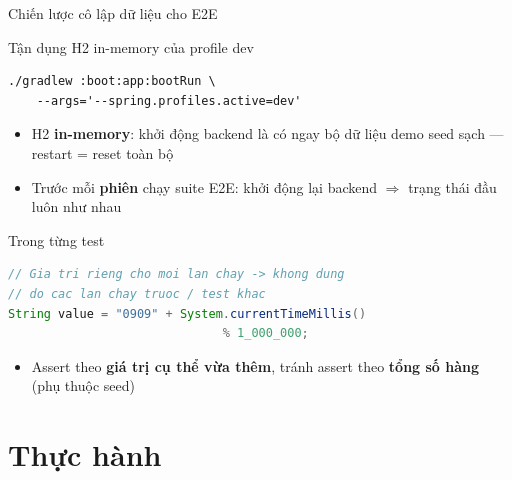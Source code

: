 \documentclass[aspectratio=169,12pt]{beamer}
\begin{document}
\begin{frame}[fragile]{Chiến lược cô lập dữ liệu cho E2E}
  \vspace*{-0.4em}
  \begin{block}{Tận dụng H2 in-memory của profile dev}
\begin{lstlisting}
./gradlew :boot:app:bootRun \
    --args='--spring.profiles.active=dev'
\end{lstlisting}
    \begin{itemize}
      \item H2 \textbf{in-memory}: khởi động backend là có ngay bộ
            dữ liệu demo seed sạch --- restart = reset toàn bộ
      \item Trước mỗi \textbf{phiên} chạy suite E2E: khởi động lại
            backend $\Rightarrow$ trạng thái đầu luôn như nhau
    \end{itemize}
  \end{block}

  \begin{exampleblock}{Trong từng test}
\begin{lstlisting}[language=Java]
// Gia tri rieng cho moi lan chay -> khong dung
// do cac lan chay truoc / test khac
String value = "0909" + System.currentTimeMillis()
                              % 1_000_000;
\end{lstlisting}
    \begin{itemize}
      \item Assert theo \textbf{giá trị cụ thể vừa thêm}, tránh assert
            theo \textbf{tổng số hàng} (phụ thuộc seed)
    \end{itemize}
  \end{exampleblock}
\end{frame}

\section{Thực hành}
\end{document}

